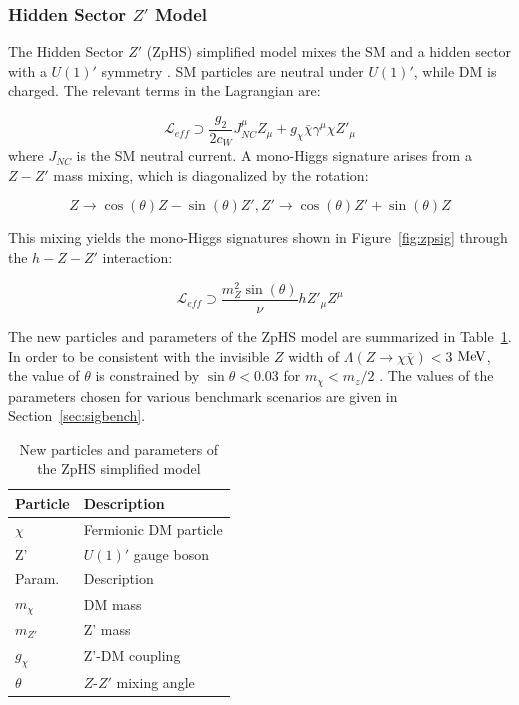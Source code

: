 \subsubsection{Hidden Sector $Z'$ Model}

The Hidden Sector $Z'$ (ZpHS) simplified model mixes the SM and a hidden sector with a $U(1)'$ symmetry \cite{Chang:2006fp, Pospelov:2007mp, Feldman:2007wj, Feng:2008mu, Gopalakrishna:2008dv}. SM particles are neutral under $U(1)'$, while DM is charged. The relevant terms in the Lagrangian are:

\begin{equation}
\mathcal{L}_{eff} \supset \frac{g_2}{2c_W} J^\mu_{NC} Z_\mu + g_\chi \bar{\chi} \gamma^\mu \chi Z'_\mu
\end{equation}
where $J_{NC}$ is the SM neutral current. A mono-Higgs signature arises from a $Z-Z'$ mass mixing, which is diagonalized by the rotation:

\begin{equation}
Z \rightarrow \cos(\theta) Z - \sin(\theta) Z', Z' \rightarrow \cos(\theta) Z' + \sin(\theta) Z
\end{equation}

This mixing yields the mono-Higgs signatures shown in Figure~\ref{fig:zpsig} through the $h-Z-Z'$ interaction: 

\begin{equation}
\mathcal{L}_{eff} \supset \frac{m_Z^2 \sin(\theta)}{\nu} h Z'_\mu Z^\mu
\end{equation}

The new particles and parameters of the ZpHS model are summarized in Table~\ref{tab:ZpHS}. In order to be consistent with the invisible $Z$ width of $\Lambda(Z\rightarrow \chi\bar{\chi})<3$ $\mathrm{Me\kern -0.1em V}$, the value of $\theta$ is constrained by $\sin\theta<0.03$ for $m_\chi < m_z/2$ \cite{PhysRevD.86.010001}. The values of the parameters chosen for various benchmark scenarios are given in Section~\ref{sec:sigbench}.

\begin{table}[htbH]
\begin{center}
\begin{tabular}{ l | l}
\hline
Particle & Description \\
\hline
$\chi$ & Fermionic DM particle \\
Z' & $U(1)'$ gauge boson \\
\hline
Param. & Description \\
\hline
$m_\chi$ & DM mass \\
$m_{Z'}$ & Z' mass \\
$g_\chi$ & Z'-DM coupling \\
$\theta$ & $Z$-$Z'$ mixing angle \\
\hline
\end{tabular}
\caption{New particles and parameters of the ZpHS simplified model \cite{Carpenter:2013xra}}\label{tab:ZpHS}
\end{center}
\end{table}

